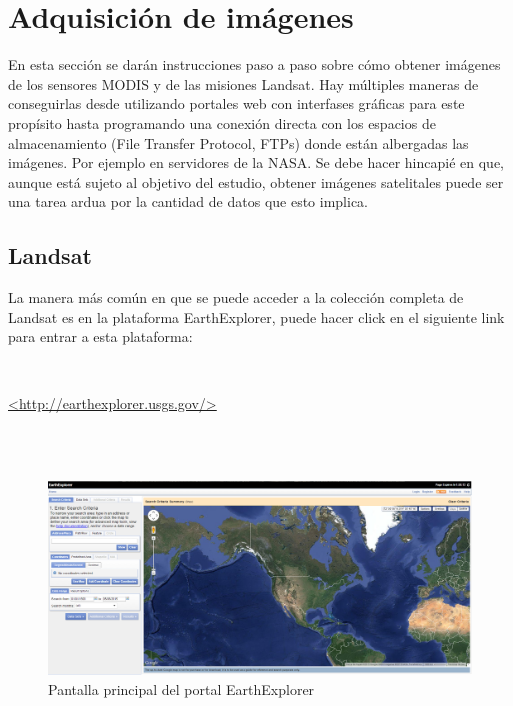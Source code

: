 \section{Adquisición de imágenes}

En esta sección se darán instrucciones paso a paso sobre cómo obtener imágenes de los sensores MODIS y de las misiones Landsat. Hay múltiples maneras de conseguirlas desde utilizando portales web con interfases gráficas para este propísito hasta programando una conexión directa con los espacios de almacenamiento (File Transfer Protocol, FTPs) donde están albergadas las imágenes. Por ejemplo en servidores de la NASA. Se debe hacer hincapié en que, aunque está sujeto al objetivo del estudio, obtener imágenes satelitales puede ser una tarea ardua por la cantidad de datos que esto implica. 

\subsection{Landsat}

La manera más común en que se puede acceder a la colección completa de Landsat es en la plataforma EarthExplorer, puede hacer click en el siguiente link para entrar a esta plataforma: 

\\
\begin{center}
\url{<http://earthexplorer.usgs.gov/>}
\end{center}
\\

\\

\begin{figure}[H!]
\begin{center}
\leavevmode
\includegraphics[width=6in]{5_earthexplorer.png}
\end{center}
\caption{Pantalla principal del portal EarthExplorer}
\end{figure}

